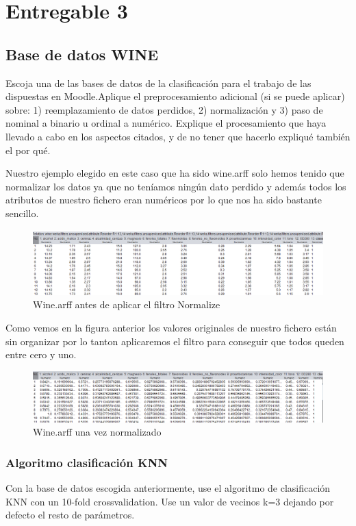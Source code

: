 \chapter{Entregable 3}

\section{Base de datos WINE}

Escoja una de las bases de datos de la clasificación para el trabajo de las dispuestas en Moodle.Aplique el preprocesamiento adicional (si se puede aplicar) sobre: 1) reemplazamiento de datos perdidos, 2) normalización y 3) paso de nominal a binario u ordinal a numérico.
Explique el procesamiento que haya llevado a cabo en los aspectos citados, y de no tener que hacerlo expliqué también el por qué.

Nuestro ejemplo elegido en este caso que ha sido wine.arff solo hemos tenido que normalizar los datos ya que no teníamos ningún dato perdido y además todos los atributos de nuestro fichero eran numéricos por lo que nos ha sido bastante sencillo.
\begin{figure}[H]
    \centering
    \includegraphics[width=\textwidth]{img/BNorm.PNG}
    \caption{Wine.arff antes de aplicar el filtro Normalize}
\end{figure}
Como vemos en la figura anterior los valores originales de nuestro fichero están sin organizar por lo tanton aplicaremos el filtro para conseguir que todos queden entre cero y uno.
\begin{figure}[H]
    \centering
    \includegraphics[width=\textwidth]{img/ANorm.PNG}
    \caption{Wine.arff una vez normalizado}
\end{figure}


\subsection{Algoritmo clasificación KNN}
Con la base de datos escogida anteriormente, use el algoritmo de clasificación KNN con un 10-fold crossvalidation. Use un valor de vecinos k=3 dejando por defecto el resto de parámetros.

